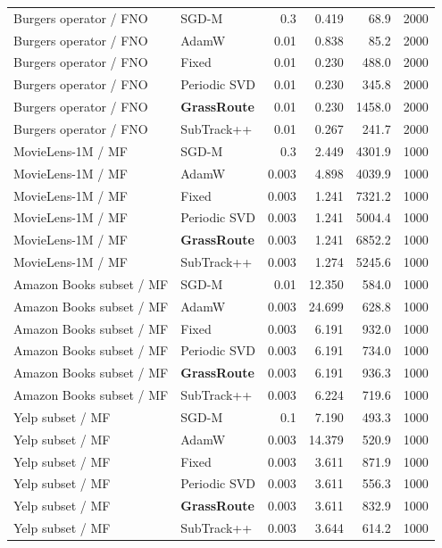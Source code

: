 {\begin{longtable}{llrrrr}
Burgers operator / FNO & SGD-M & 0.3 & 0.419 & 68.9 & 2000 \\
Burgers operator / FNO & AdamW & 0.01 & 0.838 & 85.2 & 2000 \\
Burgers operator / FNO & Fixed & 0.01 & 0.230 & 488.0 & 2000 \\
Burgers operator / FNO & Periodic SVD & 0.01 & 0.230 & 345.8 & 2000 \\
\rowcolor{oursbg}Burgers operator / FNO & \textbf{GrassRoute} & 0.01 & 0.230 & 1458.0 & 2000 \\
Burgers operator / FNO & SubTrack++ & 0.01 & 0.267 & 241.7 & 2000 \\
MovieLens-1M / MF & SGD-M & 0.3 & 2.449 & 4301.9 & 1000 \\
MovieLens-1M / MF & AdamW & 0.003 & 4.898 & 4039.9 & 1000 \\
MovieLens-1M / MF & Fixed & 0.003 & 1.241 & 7321.2 & 1000 \\
MovieLens-1M / MF & Periodic SVD & 0.003 & 1.241 & 5004.4 & 1000 \\
\rowcolor{oursbg}MovieLens-1M / MF & \textbf{GrassRoute} & 0.003 & 1.241 & 6852.2 & 1000 \\
MovieLens-1M / MF & SubTrack++ & 0.003 & 1.274 & 5245.6 & 1000 \\
Amazon Books subset / MF & SGD-M & 0.01 & 12.350 & 584.0 & 1000 \\
Amazon Books subset / MF & AdamW & 0.003 & 24.699 & 628.8 & 1000 \\
Amazon Books subset / MF & Fixed & 0.003 & 6.191 & 932.0 & 1000 \\
Amazon Books subset / MF & Periodic SVD & 0.003 & 6.191 & 734.0 & 1000 \\
\rowcolor{oursbg}Amazon Books subset / MF & \textbf{GrassRoute} & 0.003 & 6.191 & 936.3 & 1000 \\
Amazon Books subset / MF & SubTrack++ & 0.003 & 6.224 & 719.6 & 1000 \\
Yelp subset / MF & SGD-M & 0.1 & 7.190 & 493.3 & 1000 \\
Yelp subset / MF & AdamW & 0.003 & 14.379 & 520.9 & 1000 \\
Yelp subset / MF & Fixed & 0.003 & 3.611 & 871.9 & 1000 \\
Yelp subset / MF & Periodic SVD & 0.003 & 3.611 & 556.3 & 1000 \\
\rowcolor{oursbg}Yelp subset / MF & \textbf{GrassRoute} & 0.003 & 3.611 & 832.9 & 1000 \\
Yelp subset / MF & SubTrack++ & 0.003 & 3.644 & 614.2 & 1000 \\
\bottomrule\end{longtable}
}
